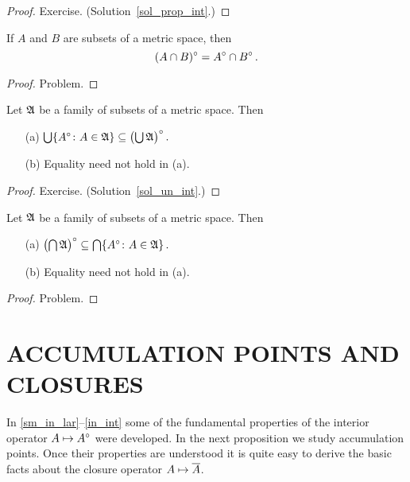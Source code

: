 \begin{proof} Exercise.  (Solution~\ref{sol_prop_int}.) \ns  \end{proof}

\begin{prop}\label{in_in} If $A$ and $B$ are subsets of a metric space, then
  \[ (A \cap B)^{\circ} = A^{\circ} \cap B^{\circ}\,. \]
\end{prop}

\begin{proof} Problem.  \ns  \end{proof}

\begin{prop}\label{un_int} Let $\mathfrak{A}$ be a family of subsets of a metric space.  Then
 \begin{enumerate}
  \item[(a)] $\bigcup\{A^{\circ} \colon A \in \mathfrak{A}\} \subseteq \bigl(\bigcup \mathfrak{A}\bigr)^{\circ}\,.$
  \item[(b)] Equality need not hold in \textup{(a)}.
 \end{enumerate}
\end{prop}

\begin{proof} Exercise.  (Solution~\ref{sol_un_int}.) \ns  \end{proof}

\begin{prop}\label{in_int} Let $\mathfrak{A}$ be a family of subsets of a metric space.  Then
 \begin{enumerate}
  \item[(a)]  $\bigl(\bigcap \mathfrak{A} \bigr)^{\circ} \subseteq \bigcap\{A^{\circ} \colon A
\in \mathfrak{A}\}\,.$
  \item[(b)] Equality need not hold in \textup{(a)}.
 \end{enumerate}
\end{prop}

\begin{proof} Problem.  \ns  \end{proof}







\section{ACCUMULATION POINTS AND CLOSURES}
In \ref{sm_in_lar}--\ref{in_int} some of the fundamental properties of the interior operator
$A \mapsto A^{\circ}$ were developed. In the next proposition we study accumulation points. Once
their properties are understood it is quite easy to derive the basic facts about the closure
operator $A \mapsto \overline{A}$.

